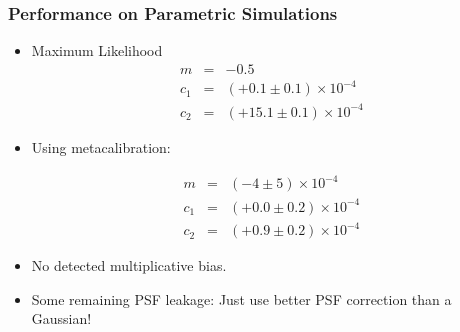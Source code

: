 \documentclass{beamer}
\newcommand{\mcal}{metacalibration}
\begin{document}
\frame
{
    \frametitle{Performance on Parametric Simulations}

 
    \begin{itemize}


        \item Maximum Likelihood 
            {\color{brightred} 
                \begin{eqnarray}
                    m & = & -0.5  \nonumber \\
                  c_1 & = & (+0.1 \pm 0.1) \times 10^{-4} \nonumber \\
                  c_2 & = & (+15.1 \pm 0.1) \times 10^{-4} \nonumber
                \end{eqnarray}
            }


        \item Using \mcal:

            {\color{gold} 
                \begin{eqnarray}
                    m & = & (-4 \pm 5) \times 10^{-4} \nonumber \\
                  c_1 & = & (+0.0 \pm 0.2) \times 10^{-4} \nonumber \\
                  c_2 & = & (+0.9 \pm 0.2) \times 10^{-4} \nonumber
                \end{eqnarray}
            }


        \item No detected multiplicative bias.
        \item Some remaining PSF leakage: Just use
            better PSF correction than a Gaussian!

    \end{itemize}

}
\end{document}

